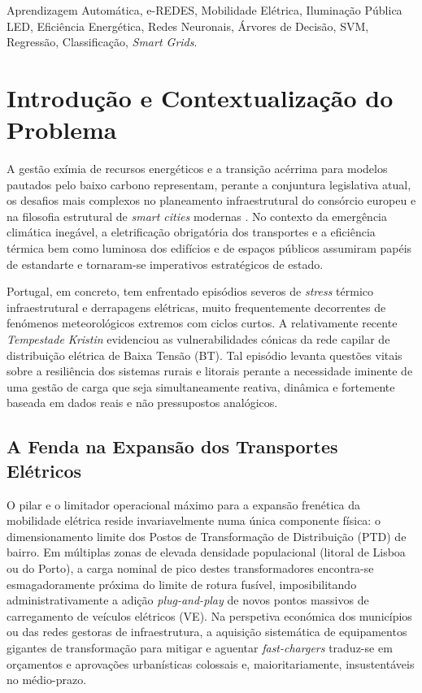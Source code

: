 \documentclass[conference]{IEEEtran}
\begin{document}
\begin{IEEEkeywords}
Aprendizagem Automática, e-REDES, Mobilidade Elétrica, Iluminação Pública LED, Eficiência Energética, Redes Neuronais, Árvores de Decisão, SVM, Regressão, Classificação, \textit{Smart Grids}.
\end{IEEEkeywords}

\section{Introdução e Contextualização do Problema}

A gestão exímia de recursos energéticos e a transição acérrima para modelos pautados pelo baixo carbono representam, perante a conjuntura legislativa atual, os desafios mais complexos no planeamento infraestrutural do consórcio europeu e na filosofia estrutural de \textit{smart cities} modernas \cite{b4}. No contexto da emergência climática inegável, a eletrificação obrigatória dos transportes e a eficiência térmica bem como luminosa dos edifícios e de espaços públicos assumiram papéis de estandarte e tornaram-se imperativos estratégicos de estado.

Portugal, em concreto, tem enfrentado episódios severos de \textit{stress} térmico infraestrutural e derrapagens elétricas, muito frequentemente decorrentes de fenómenos meteorológicos extremos com ciclos curtos. A relativamente recente \textit{Tempestade Kristin} evidenciou as vulnerabilidades cónicas da rede capilar de distribuição elétrica de Baixa Tensão (BT). Tal episódio levanta questões vitais sobre a resiliência dos sistemas rurais e litorais perante a necessidade iminente de uma gestão de carga que seja simultaneamente reativa, dinâmica e fortemente baseada em dados reais e não pressupostos analógicos.

\subsection{A Fenda na Expansão dos Transportes Elétricos}
O pilar e o limitador operacional máximo para a expansão frenética da mobilidade elétrica reside invariavelmente numa única componente física: o dimensionamento limite dos Postos de Transformação de Distribuição (PTD) de bairro. Em múltiplas zonas de elevada densidade populacional (litoral de Lisboa ou do Porto), a carga nominal de pico destes transformadores encontra-se esmagadoramente próxima do limite de rotura fusível, imposibilitando administrativamente a adição \textit{plug-and-play} de novos pontos massivos de carregamento de veículos elétricos (VE). Na perspetiva económica dos municípios ou das redes gestoras de infraestrutura, a aquisição sistemática de equipamentos gigantes de transformação para mitigar e aguentar \textit{fast-chargers} traduz-se em orçamentos e aprovações urbanísticas colossais e, maioritariamente, insustentáveis no médio-prazo.
\end{document}
